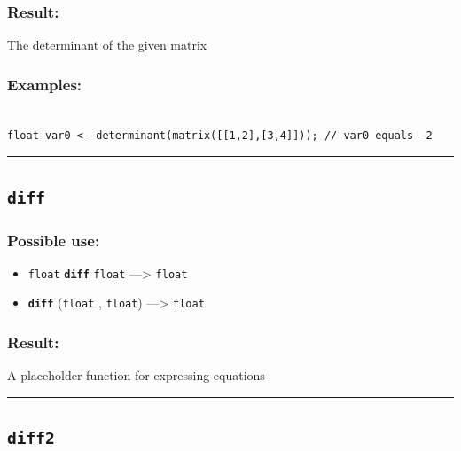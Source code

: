\documentclass[]{book}
\providecommand{\tightlist}{%
  \setlength{\itemsep}{0pt}\setlength{\parskip}{0pt}}
\theoremstyle{definition}
\theoremstyle{definition}
\theoremstyle{definition}
\theoremstyle{remark}
\begin{document}
\subsubsection{Result:}\label{result-125}

The determinant of the given matrix

\subsubsection{Examples:}\label{examples-99}

\begin{verbatim}
 
float var0 <- determinant(matrix([[1,2],[3,4]])); // var0 equals -2
\end{verbatim}

\begin{center}\rule{0.5\linewidth}{\linethickness}\end{center}

\subsection{\texorpdfstring{\texttt{diff}}{diff}}\label{diff}

\subsubsection{Possible use:}\label{possible-use-130}

\begin{itemize}
\tightlist
\item
  \texttt{float} \textbf{\texttt{diff}} \texttt{float} ---\textgreater{}
  \texttt{float}
\item
  \textbf{\texttt{diff}} (\texttt{float} , \texttt{float})
  ---\textgreater{} \texttt{float}
\end{itemize}

\subsubsection{Result:}\label{result-126}

A placeholder function for expressing equations

\begin{center}\rule{0.5\linewidth}{\linethickness}\end{center}

\subsection{\texorpdfstring{\texttt{diff2}}{diff2}}\label{diff2}
\end{document}
